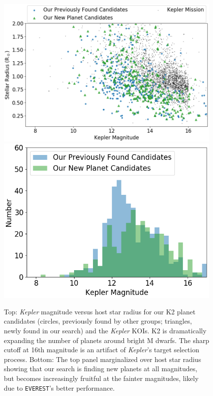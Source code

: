 \documentclass[twocolumn]{aastex62}
\newcommand{\project}[1]{\textsl{#1}}
\newcommand{\pipeline}[1]{\texttt{#1}}
\begin{document}
\begin{figure}[tbp]
\includegraphics[width=\columnwidth]{candidate_mag_rstar.png}
\includegraphics[width=\columnwidth]{candidate_mag.png}
\caption{Top: \project{Kepler} magnitude versus host star radius for
  our K2 planet candidates (circles, previously found by other groups;
  triangles, newly found in our search) and the \project{Kepler}
  KOIs. K2 is dramatically expanding the number of planets around
  bright M dwarfs. The sharp cutoff at 16th magnitude is an artifact
  of \project{Kepler}'s target selection process. \label{mag_rstar}
  Bottom: The top panel marginalized over host star radius showing
  that our search is finding new planets at all magnitudes, but
  becomes increasingly fruitful at the fainter magnitudes, likely due
  to \pipeline{EVEREST}'s better performance.}
\end{figure}
\end{document}
